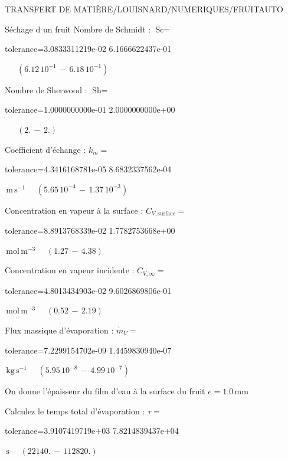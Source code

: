 \documentclass[12pt]{article}
\begin{document}
\begin{quiz}{TRANSFERT DE MATIÈRE/LOUISNARD/NUMERIQUES/FRUITAUTO}
\begin{cloze}{Séchage d un fruit}
Nombre de Schmidt : $\text{Sc} =  $
\begin{numerical}[points=1] 
\item[tolerance={3.0833311219e-02}] 6.1666622437e-01 
\end{numerical} 
 $\,$ 
 $ \quad ( 6.12 \, 10^{-1}  \, - \,  6.18 \, 10^{-1} ) $ 

Nombre de Sherwood : $\text{Sh} =  $
\begin{numerical}[points=2] 
\item[tolerance={1.0000000000e-01}] 2.0000000000e+00 
\end{numerical} 
 $\,$ 
 $ \quad (2. \, - \, 2.) $ 

Coefficient d'échange : $k_m =  $
\begin{numerical}[points=1] 
\item[tolerance={4.3416168781e-05}] 8.6832337562e-04 
\end{numerical} 
 $\,  \mathrm{m}\,  \mathrm{s}^{-1}$ 
 $ \quad ( 5.65 \, 10^{-4}  \, - \,  1.37 \, 10^{-3} ) $ 

Concentration en vapeur à la surface : $C_{V, \text{surface}} =  $
\begin{numerical}[points=2] 
\item[tolerance={8.8913768339e-02}] 1.7782753668e+00 
\end{numerical} 
 $\,  \mathrm{mol}\,  \mathrm{m}^{-3}$ 
 $ \quad (1.27 \, - \, 4.38) $ 

Concentration en vapeur incidente : $C_{V, \infty} =  $
\begin{numerical}[points=2] 
\item[tolerance={4.8013434903e-02}] 9.6026869806e-01 
\end{numerical} 
 $\,  \mathrm{mol}\,  \mathrm{m}^{-3}$ 
 $ \quad (0.52 \, - \, 2.19) $ 

Flux massique d'évaporation : $\dot{m}_V =  $
\begin{numerical}[points=1] 
\item[tolerance={7.2299154702e-09}] 1.4459830940e-07 
\end{numerical} 
 $\,  \mathrm{kg}\,  \mathrm{s}^{-1}$ 
 $ \quad ( 5.95 \, 10^{-8}  \, - \,  4.99 \, 10^{-7} ) $ 

 

On donne l'épaisseur du film d'eau à la surface du fruit $e = 1.0\,  \mathrm{mm} $

Calculez le temps total d'évaporation : $\tau =  $
\begin{numerical}[points=2] 
\item[tolerance={3.9107419719e+03}] 7.8214839437e+04 
\end{numerical} 
 $\,  \mathrm{s}$ 
 $ \quad (22140. \, - \, 112820.) $ 


\end{cloze}
\end{quiz}
\end{document}
